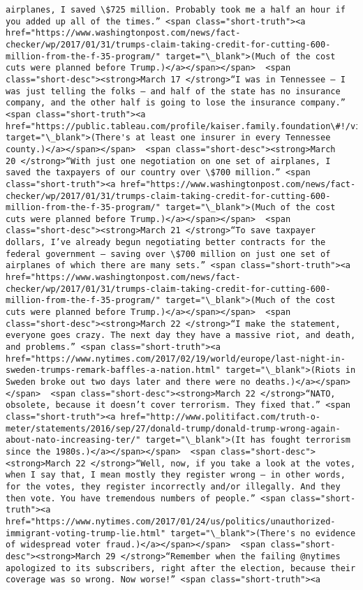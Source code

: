 \documentclass[11pt]{article}
\begin{document}
\begin{Verbatim}[commandchars=\\\{\}]
airplanes, I saved \$725 million. Probably took me a half an hour if you added up all of the times.” <span class="short-truth"><a href="https://www.washingtonpost.com/news/fact-checker/wp/2017/01/31/trumps-claim-taking-credit-for-cutting-600-million-from-the-f-35-program/" target="\_blank">(Much of the cost cuts were planned before Trump.)</a></span></span>  <span class="short-desc"><strong>March 17 </strong>“I was in Tennessee — I was just telling the folks — and half of the state has no insurance company, and the other half is going to lose the insurance company.” <span class="short-truth"><a href="https://public.tableau.com/profile/kaiser.family.foundation\#!/vizhome/InsurerParticipationinthe2017IndividualMarketplace/2017InsurerParticipation" target="\_blank">(There's at least one insurer in every Tennessee county.)</a></span></span>  <span class="short-desc"><strong>March 20 </strong>“With just one negotiation on one set of airplanes, I saved the taxpayers of our country over \$700 million.” <span class="short-truth"><a href="https://www.washingtonpost.com/news/fact-checker/wp/2017/01/31/trumps-claim-taking-credit-for-cutting-600-million-from-the-f-35-program/" target="\_blank">(Much of the cost cuts were planned before Trump.)</a></span></span>  <span class="short-desc"><strong>March 21 </strong>“To save taxpayer dollars, I’ve already begun negotiating better contracts for the federal government — saving over \$700 million on just one set of airplanes of which there are many sets.” <span class="short-truth"><a href="https://www.washingtonpost.com/news/fact-checker/wp/2017/01/31/trumps-claim-taking-credit-for-cutting-600-million-from-the-f-35-program/" target="\_blank">(Much of the cost cuts were planned before Trump.)</a></span></span>  <span class="short-desc"><strong>March 22 </strong>“I make the statement, everyone goes crazy. The next day they have a massive riot, and death, and problems.” <span class="short-truth"><a href="https://www.nytimes.com/2017/02/19/world/europe/last-night-in-sweden-trumps-remark-baffles-a-nation.html" target="\_blank">(Riots in Sweden broke out two days later and there were no deaths.)</a></span></span>  <span class="short-desc"><strong>March 22 </strong>“NATO, obsolete, because it doesn’t cover terrorism. They fixed that.” <span class="short-truth"><a href="http://www.politifact.com/truth-o-meter/statements/2016/sep/27/donald-trump/donald-trump-wrong-again-about-nato-increasing-ter/" target="\_blank">(It has fought terrorism since the 1980s.)</a></span></span>  <span class="short-desc"><strong>March 22 </strong>“Well, now, if you take a look at the votes, when I say that, I mean mostly they register wrong — in other words, for the votes, they register incorrectly and/or illegally. And they then vote. You have tremendous numbers of people.” <span class="short-truth"><a href="https://www.nytimes.com/2017/01/24/us/politics/unauthorized-immigrant-voting-trump-lie.html" target="\_blank">(There's no evidence of widespread voter fraud.)</a></span></span>  <span class="short-desc"><strong>March 29 </strong>“Remember when the failing @nytimes apologized to its subscribers, right after the election, because their coverage was so wrong. Now worse!” <span class="short-truth"><a 
\end{Verbatim}
\end{document}
